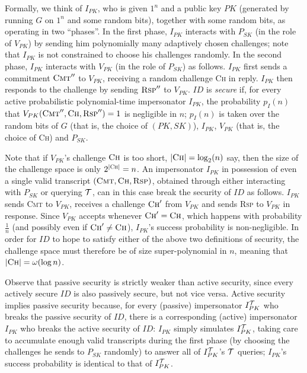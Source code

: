 Formally, we think of $I_{PK}$, who is given $1^n$ and a public key $PK$
(generated by running $G$ on $1^n$ and some random bits), together with some
random bits, as operating in two ``phases''. In the first phase, $I_{PK}$
interacts with $P_{SK}$ (in the role of $V_{PK}$) by sending him polynomially
many adaptively chosen challenges; note that $I_{PK}$ is not constrained to
choose his challenges randomly.
In the second phase, $I_{PK}$ interacts with $V_{PK}$ (in the role of
$P_{SK}$) as follows. $I_{PK}$ first sends a commitment $\textsc{Cmt}''$ to
$V_{PK}$, receiving a random challenge \textsc{Ch} in reply. $I_{PK}$ then
responds to the challenge by sending $\textsc{Rsp}''$ to $V_{PK}$. $ID$ is
{\it secure} if, for every active probabilistic polynomial-time impersonator
$I_{PK}$, the probability $p_I(n)$ that
$V_{PK}(\textsc{Cmt}'',\textsc{Ch},\textsc{Rsp}'') = 1$ is negligible in $n$;
$p_I(n)$ is taken over the random bits of $G$ (that is, the choice of
$(PK,SK)$), $I_{PK}$, $V_{PK}$ (that is, the choice of \textsc{Ch}) and
$P_{SK}$.

Note that if $V_{PK}$'s challenge $\textsc{Ch}$ is too short,
$|\textsc{Ch}| = \log_2(n)$ say, then the size of the challenge space is only
$2^{|\textsc{Ch}|} = n$. 
An impersonator $I_{PK}$ in possession of even a single valid transcript
$(\textsc{Cmt},\textsc{Ch},\textsc{Rsp})$, obtained through either interacting
with $P_{SK}$ or querying $\mathcal{T}$, can in this case break the security of $ID$ as
follows. $I_{PK}$ sends \textsc{Cmt} to $V_{PK}$, receives a challenge
$\textsc{Ch}'$ from $V_{PK}$ and sends \textsc{Rsp} to $V_{PK}$ in response. Since $V_{PK}$
accepts whenever $\textsc{Ch}' = \textsc{Ch}$, which happens with probability
$\frac{1}{n}$ (and possibly even if $\textsc{Ch}' \neq \textsc{Ch}$),
$I_{PK}$'s success probability is non-negligible.  In order for $ID$ to hope
to satisfy either of the above two definitions of security, the challenge
space must therefore be of size super-polynomial in $n$, meaning that
$|\textsc{Ch}| = \omega(\log n)$. 

Observe that passive security is strictly weaker than active security, since
every actively secure $ID$ is also passively secure, but not vice versa.
Active security implies passive security because, for every (passive)
impersonator $I_{PK}^{\mathcal{T}}$ who breaks the passive security of $ID$, there is
a corresponding (active) impersonator $I_{PK}$ who breaks the active security
of $ID$: $I_{PK}$ simply simulates $I_{PK}^{\mathcal{T}}$, taking care to accumulate
enough valid transcripts during the first phase (by choosing the challenges he
sends to $P_{SK}$ randomly) to answer all of $I_{PK}^{\mathcal{T}}$'s $\mathcal{T}$ queries; 
$I_{PK}$'s success probability is identical to that of $I_{PK}^{\mathcal{T}}$. 

